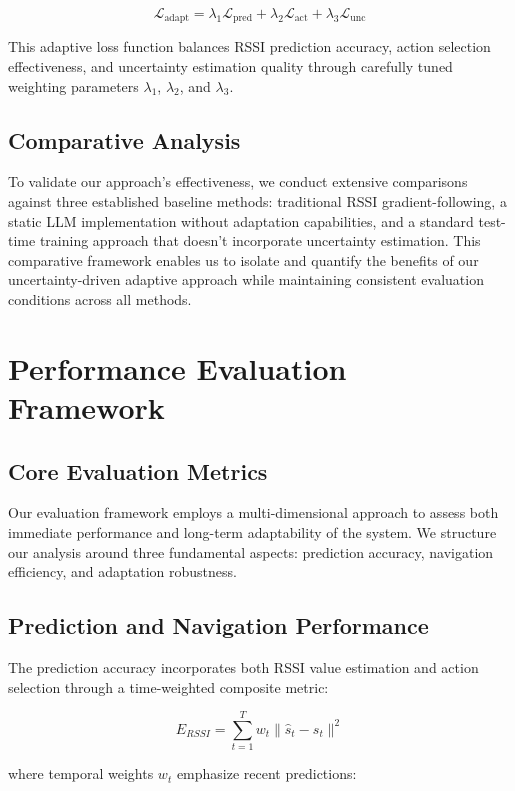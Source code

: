 \documentclass[12pt]{article}
\begin{document}
\[
\mathcal{L}_{\text{adapt}} = \lambda_1 \mathcal{L}_{\text{pred}} + \lambda_2 \mathcal{L}_{\text{act}} + \lambda_3 \mathcal{L}_{\text{unc}}
\]

This adaptive loss function balances RSSI prediction accuracy, action selection effectiveness, and uncertainty estimation quality through carefully tuned weighting parameters \(\lambda_1\), \(\lambda_2\), and \(\lambda_3\).


\subsection{Comparative Analysis}

To validate our approach's effectiveness, we conduct extensive comparisons against three established baseline methods: traditional RSSI gradient-following, a static LLM implementation without adaptation capabilities, and a standard test-time training approach that doesn't incorporate uncertainty estimation. This comparative framework enables us to isolate and quantify the benefits of our uncertainty-driven adaptive approach while maintaining consistent evaluation conditions across all methods.

\section{Performance Evaluation Framework}

\subsection{Core Evaluation Metrics}

Our evaluation framework employs a multi-dimensional approach to assess both immediate performance and long-term adaptability of the system. We structure our analysis around three fundamental aspects: prediction accuracy, navigation efficiency, and adaptation robustness.

\subsection{Prediction and Navigation Performance}

The prediction accuracy incorporates both RSSI value estimation and action selection through a time-weighted composite metric:

\[
    E_{RSSI} = \sum_{t=1}^T w_t \|\hat{s}_t - s_t\|^2
\]

where temporal weights \( w_t \) emphasize recent predictions:
\end{document}
